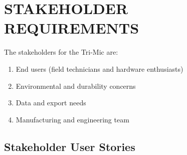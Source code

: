 \section{STAKEHOLDER REQUIREMENTS}

The stakeholders for the Tri-Mic are:

\begin{enumerate}
	\item End users (field technicians and hardware enthusiasts)
	\item Environmental and durability concerns
	\item Data and export needs
	\item Manufacturing and engineering team
\end{enumerate}

\subsection{Stakeholder User Stories}

